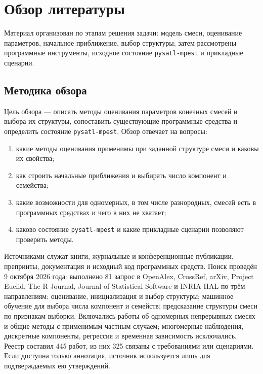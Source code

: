 
\section{Обзор литературы}
\label{sec:relatedworks}

Материал организован по этапам решения задачи: модель смеси, оценивание параметров, начальное приближение, выбор структуры; затем рассмотрены программные инструменты, исходное состояние \texttt{pysatl-mpest} и прикладные сценарии.

\subsection{Методика обзора}
\label{sec:review-method}

Цель обзора --- описать методы оценивания параметров конечных смесей и выбора их структуры, сопоставить существующие программные средства и определить состояние \texttt{pysatl-mpest}. Обзор отвечает на вопросы:
\begin{enumerate}
    \item какие методы оценивания применимы при заданной структуре смеси и каковы их свойства;
    \item как строить начальные приближения и выбирать число компонент и семейства;
    \item какие возможности для одномерных, в том числе разнородных, смесей есть в программных средствах и чего в них не хватает;
    \item каково состояние \texttt{pysatl-mpest} и какие прикладные сценарии позволяют проверить методы.
\end{enumerate}

Источниками служат книги, журнальные и конференционные публикации, препринты, документация и исходный код программных средств. Поиск проведён 9 октября 2026 года: выполнено 81 запрос в OpenAlex, CrossRef, arXiv, Project Euclid, The R Journal, Journal of Statistical Software и INRIA HAL по трём направлениям: оценивание, инициализация и выбор структуры; машинное обучение для выбора числа компонент и семейств; предсказание структуры смеси по признакам выборки. Включались работы об одномерных непрерывных смесях и общие методы с применимым частным случаем; многомерные наблюдения, дискретные компоненты, регрессия и временная зависимость исключались. Реестр составил 445 работ, из них 325 связаны с требованиями или сценариями. Если доступна только аннотация, источник используется лишь для подтверждаемых ею утверждений.

